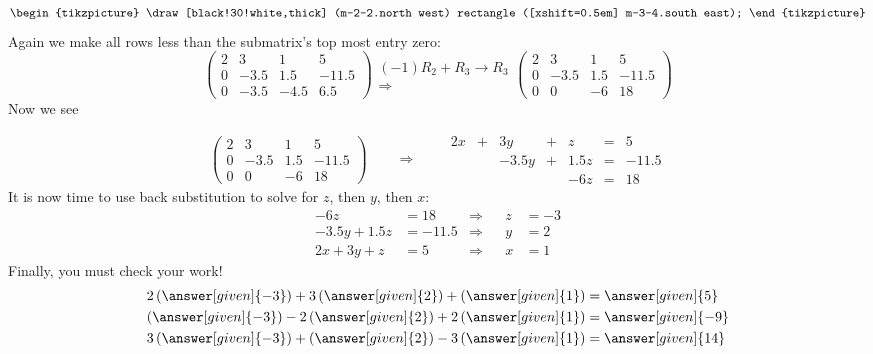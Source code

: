 \documentclass{ximera}
\begin{document}
\begin{example}
\begin{explanation}
\[\begin{tikzpicture}
  \draw[black!30!white,thick] (m-2-2.north west) rectangle ([xshift=0.5em] m-3-4.south east);
\end{tikzpicture}
\]
Again we make all rows less than the submatrix's top most entry zero:
\[
\begin{pmatrix}
  2 & 3 & 1 & 5 \\
  0 & -3.5 & 1.5 &-11.5 \\
  0 & -3.5 & -4.5 & 6.5
\end{pmatrix}
\begin{array}{c}
  \scriptstyle(-1) R_2+R_3\to R_3\\ \Longrightarrow
\end{array}
\begin{pmatrix}
  2 & 3 & 1 & 5 \\
  0 & -3.5 & 1.5 &-11.5 \\
  0 & 0    & -6 & 18
\end{pmatrix}
\]
Now we see

\[
\left(\begin{array}{ccc|c}
  2 & 3 & 1 & 5 \\
  0 & -3.5 & 1.5 &-11.5 \\
  0 & 0    & -6 & 18
\end{array}\right)
\qquad\Longrightarrow\qquad
\begin{array}{ccccccc}
     2x  &+ & 3y &+& z &=& 5 \\
     &  &-3.5y&+&1.5z&=&-11.5\\
     & & & &-6z&=&18
\end{array}
\]
It is now time to use back substitution to solve for $z$, then $y$, then $x$:
\begin{align*}
  -6z &= 18   &\Rightarrow & & z &= -3\\
  -3.5y+1.5z &=-11.5 &\Rightarrow & & y &= 2\\
  2x  +  3y + z &= 5 &\Rightarrow & & x &= 1
\end{align*}
Finally, you must check your work!
  \begin{align*}
    2\left(\answer[given]{-3}\right)+ 3\left(\answer[given]{2}\right) + \left(\answer[given]{1}\right)  &= \answer[given]{5} \\
    \left(\answer[given]{-3}\right) -2\left(\answer[given]{2}\right)+ 2\left(\answer[given]{1}\right) &=\answer[given]{-9}\\
    3\left(\answer[given]{-3}\right) +\left(\answer[given]{2}\right)- 3\left(\answer[given]{1}\right) &=\answer[given]{14}
  \end{align*}


\end{explanation}
\end{example}
\end{document}
